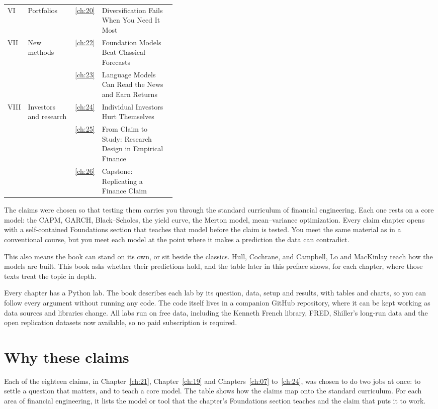 \begin{table}[htbp]
\begin{tabularx}{0.95\linewidth}{@{}>{\raggedright\arraybackslash}p{0.07\linewidth}>{\raggedright\arraybackslash}p{0.28\linewidth}>{\raggedleft\arraybackslash}p{0.04\linewidth}>{\raggedright\arraybackslash}X@{}}
\addlinespace
VI & Portfolios & \ref{ch:20} & Diversification Fails When You Need It Most \\
\addlinespace
VII & New methods & \ref{ch:22} & Foundation Models Beat Classical Forecasts \\
 &  & \ref{ch:23} & Language Models Can Read the News and Earn Returns \\
\addlinespace
VIII & Investors and research & \ref{ch:24} & Individual Investors Hurt Themselves \\
 &  & \ref{ch:25} & From Claim to Study: Research Design in Empirical Finance \\
 &  & \ref{ch:26} & Capstone: Replicating a Finance Claim \\
\bottomrule
\end{tabularx}
\end{table}


The claims were chosen so that testing them carries you through the standard curriculum of financial engineering. Each one rests on a core model: the CAPM, GARCH, Black--Scholes, the yield curve, the Merton model, mean--variance optimization. Every claim chapter opens with a self-contained Foundations section that teaches that model before the claim is tested. You meet the same material as in a conventional course, but you meet each model at the point where it makes a prediction the data can contradict.

This also means the book can stand on its own, or sit beside the classics. Hull, Cochrane, and Campbell, Lo and MacKinlay teach how the models are built. This book asks whether their predictions hold, and the table later in this preface shows, for each chapter, where those texts treat the topic in depth.

Every chapter has a Python lab. The book describes each lab by its question, data, setup and results, with tables and charts, so you can follow every argument without running any code. The code itself lives in a companion GitHub repository, where it can be kept working as data sources and libraries change. All labs run on free data, including the Kenneth French library, FRED, Shiller's long-run data and the open replication datasets now available, so no paid subscription is required.

\section*{Why these claims}

Each of the eighteen claims, in Chapter~\ref{ch:21}, Chapter~\ref{ch:19} and Chapters~\ref{ch:07} to~\ref{ch:24}, was chosen to do two jobs at once: to settle a question that matters, and to teach a core model. The table shows how the claims map onto the standard curriculum. For each area of financial engineering, it lists the model or tool that the chapter's Foundations section teaches and the claim that puts it to work.


